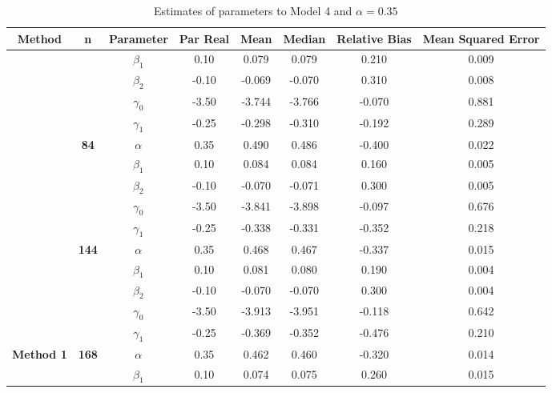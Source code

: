 \begin{table}[h]

\caption{\label{tab:Est_model_4_Alpha0.35}Estimates of parameters to Model 4 and $\alpha=0.35$}
\centering
\begin{tabular}[t]{>{}c>{}ccccccc}
\toprule
Method & n & Parameter & Par Real & Mean & Median & Relative Bias & Mean Squared Error\\
\midrule
 &  & $\beta_1$ & 0.10 & 0.079 & 0.079 & 0.210 & 0.009\\

 &  & $\beta_2$ & -0.10 & -0.069 & -0.070 & 0.310 & 0.008\\

 &  & $\gamma_0$ & -3.50 & -3.744 & -3.766 & -0.070 & 0.881\\

 &  & $\gamma_1$ & -0.25 & -0.298 & -0.310 & -0.192 & 0.289\\

 & \multirow{-5}{*}{\centering\arraybackslash \textbf{84}} & $\alpha$ & 0.35 & 0.490 & 0.486 & -0.400 & 0.022\\

 &  & $\beta_1$ & 0.10 & 0.084 & 0.084 & 0.160 & 0.005\\

 &  & $\beta_2$ & -0.10 & -0.070 & -0.071 & 0.300 & 0.005\\

 &  & $\gamma_0$ & -3.50 & -3.841 & -3.898 & -0.097 & 0.676\\

 &  & $\gamma_1$ & -0.25 & -0.338 & -0.331 & -0.352 & 0.218\\

 & \multirow{-5}{*}{\centering\arraybackslash \textbf{144}} & $\alpha$ & 0.35 & 0.468 & 0.467 & -0.337 & 0.015\\

 &  & $\beta_1$ & 0.10 & 0.081 & 0.080 & 0.190 & 0.004\\

 &  & $\beta_2$ & -0.10 & -0.070 & -0.070 & 0.300 & 0.004\\

 &  & $\gamma_0$ & -3.50 & -3.913 & -3.951 & -0.118 & 0.642\\

 &  & $\gamma_1$ & -0.25 & -0.369 & -0.352 & -0.476 & 0.210\\

\multirow{-15}{*}{\centering\arraybackslash \textbf{Method 1}} & \multirow{-5}{*}{\centering\arraybackslash \textbf{168}} & $\alpha$ & 0.35 & 0.462 & 0.460 & -0.320 & 0.014\\
\cmidrule{1-8}
 &  & $\beta_1$ & 0.10 & 0.074 & 0.075 & 0.260 & 0.015\\


\end{tabular}
\end{table}
